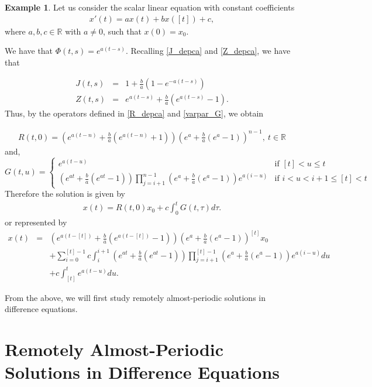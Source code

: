 \documentclass[english,,reqno]{amsart}
\numberwithin{equation}{section}
\newcommand{\bb}[1]{\mathbb{#1}}
\theoremstyle{plain}
\theoremstyle{definition}
\newtheorem{exam}{Example}[section]
\theoremstyle{remark}
\begin{document}
\begin{exam}
Let us consider the scalar linear equation with constant coefficients  
\begin{eqnarray*}
x'(t) = a x(t) + b x([t]) + c, 
\end{eqnarray*}  
where $a, b, c \in \mathbb{R}$ with $a \neq 0$, such that $x(0) = x_0$.  

We have that $\Phi(t,s) = e^{a(t - s)}$. Recalling \eqref{J_depca} and \eqref{Z_depca}, we have that

\begin{eqnarray*}
J(t,s)&=& 1+\frac{b}{a}(1-e^{-a(t-s)}) \\
Z(t,s)&=& e^{a(t-s)}+\frac{b}{a}(e^{a(t-s)}-1).
\end{eqnarray*}
Thus, by the operators defined in \eqref{R_depca} and \eqref{varpar_G}, we obtain

\begin{eqnarray*}
R(t,0)=(e^{a(t-n)}+\frac{b}{a}(e^{a(t-n)}+1)) \left(e^{a}+\frac{b}{a}(e^{a}-1)\right)^{n-1},\ t\in\bb{R} 
\end{eqnarray*}
and,
\[
G(t,u)=\begin{cases}
e^{a(t-u)} & \mbox{if }[t]<u\leq t\\
\left(e^{at}+\frac{b}{a}(e^{at}-1)\right) \displaystyle{\prod_{j=i+1}^{n-1}} (e^{a}+\frac{b}{a}(e^{a}-1))e^{a(i-u)} & \mbox{if }i<u<i+1\leq[t]<t
\end{cases} \label{G_depca_example}
\]
Therefore the solution is given by
\begin{eqnarray*}
x(t)=R(t,0)x_0+c\int_{0}^{t} G(t,\tau)d\tau.
\end{eqnarray*}
or represented by
\begin{eqnarray*}
x(t) & = & (e^{a(t-[t])}+\frac{b}{a}(e^{a(t-[t])}-1)) \left(e^{a}+\frac{b}{a}(e^{a}-1)\right)^{[t]} x_0\\
 &  & +\sum_{i=0}^{[t]-1}c \int_{i}^{i+1} \left(e^{at}+\frac{b}{a}(e^{at}-1)\right) \prod_{j=i+1}^{[t]-1} (e^{a}+\frac{b}{a}(e^{a}-1))e^{a(i-u)} du\\
 &&+c\int_{[t]}^{t}e^{a(t-u)}du.
\end{eqnarray*}
\end{exam}

From the above, we will first study remotely almost-periodic solutions in difference equations.

\section{Remotely Almost-Periodic Solutions in Difference Equations}\label{sec4}
\end{document}
